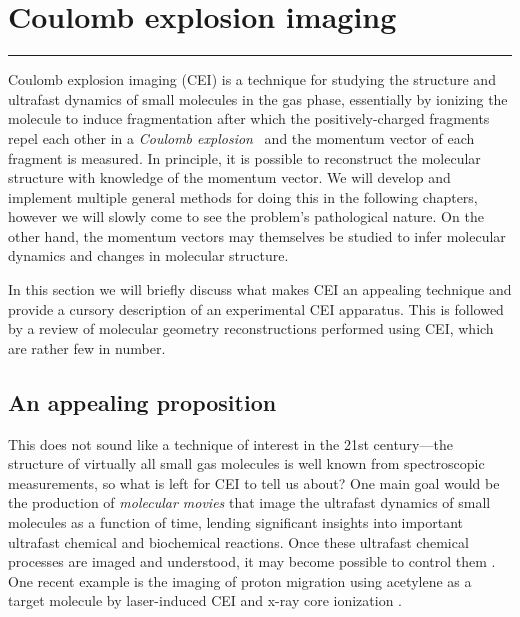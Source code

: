 \chapter{Coulomb explosion imaging}\label{ch:CEI}

\vspace{-1.5 em}
\begin{addmargin}[-0.5cm]{0cm}
  \minitoc
\end{addmargin}
\hrule
\vspace{1.5 em}

Coulomb explosion imaging (CEI) is a technique for studying the structure and ultrafast dynamics of small molecules in the gas phase, essentially by ionizing the molecule to induce fragmentation after which the positively-charged fragments repel each other in a \emph{Coulomb explosion}\footnotemark~ and the momentum vector of each fragment is measured. In principle, it is possible to reconstruct the molecular structure with knowledge of the momentum vector. We will develop and implement multiple general methods for doing this in the following chapters, however we will slowly come to see the problem's pathological nature. On the other hand, the momentum vectors may themselves be studied to infer molecular dynamics and changes in molecular structure.


In this section we will briefly discuss what makes CEI an appealing technique and provide a cursory description of an experimental CEI apparatus. This is followed by a review of molecular geometry reconstructions performed using CEI, which are rather few in number.


\section{An appealing proposition}
This does not sound like a technique of interest in the 21st century---the structure of virtually all small gas molecules is well known from spectroscopic measurements, so what is left for CEI to tell us about? One main goal would be the production of \emph{molecular movies} that image the ultrafast dynamics of small molecules as a function of time, lending significant insights into important ultrafast chemical and biochemical reactions. Once these ultrafast chemical processes are imaged and understood, it may become possible to control them \citep{Miller10,Zewail00,Weinstein12}. One recent example is the imaging of proton migration using acetylene as a target molecule by laser-induced CEI \citep{Ibrahim14} and x-ray core ionization \citep{Liekhus-Schmaltz15}.

